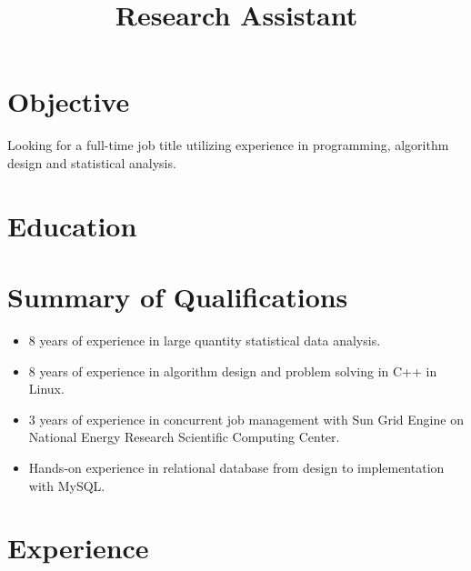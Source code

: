 \documentclass[11pt,letterpaper]{moderncv}
\title{Research Assistant}
\begin{document}
\makecvtitle


\section{Objective}
Looking for a full-time job title utilizing experience in programming, algorithm design and statistical analysis.


\section{Education}


\section{Summary of Qualifications}
\begin{itemize}
	\item 8 years of experience in large quantity statistical data analysis.
	\item 8 years of experience in algorithm design and problem solving in C++ in Linux.
	\item 3 years of experience in concurrent job management with Sun Grid Engine on National Energy Research Scientific Computing Center.
	\item Hands-on experience in relational database from design to implementation with MySQL.
\end{itemize}

\section{Experience}
\end{document}
